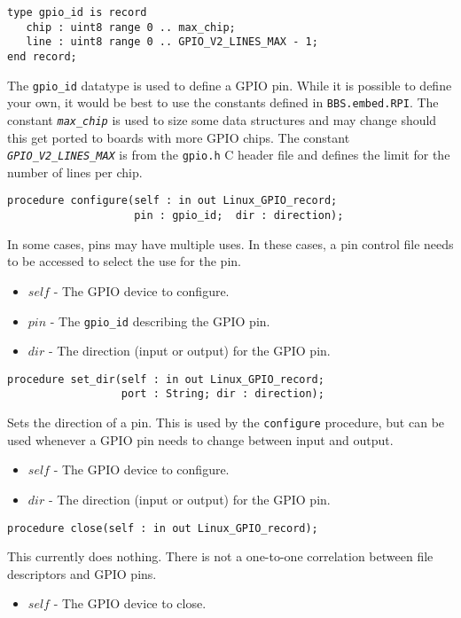 \documentclass[10pt, openany]{book}
\newcommand{\indextype}[1]{\index[type]{#1}}
\newcommand{\indexfunc}[1]{\index[func]{#1}}
\newcommand{\package}[1]{\texttt{#1}}
\newcommand{\function}[1]{\texttt{#1}}
\newcommand{\constant}[1]{\emph{\texttt{#1}}}
\newcommand{\datatype}[1]{\texttt{#1}}
\newcommand{\filename}[1]{\texttt{#1}}
\begin{document}
\begin{lstlisting}
type gpio_id is record
   chip : uint8 range 0 .. max_chip;
   line : uint8 range 0 .. GPIO_V2_LINES_MAX - 1;
end record;
\end{lstlisting}
\indextype{gpio\_id}
The \datatype{gpio\_id} datatype is used to define a GPIO pin.  While it is possible to define your own, it would be best to use the constants defined in \package{BBS.embed.RPI}.  The constant \constant{max\_chip} is used to size some data structures and may change should this get ported to boards with more GPIO chips.  The constant \constant{GPIO\_V2\_LINES\_MAX} is from the \filename{gpio.h} C header file and defines the limit for the number of lines per chip.

\begin{lstlisting}
procedure configure(self : in out Linux_GPIO_record;
                    pin : gpio_id;  dir : direction);
\end{lstlisting}
\indexfunc{configure}
In some cases, pins may have multiple uses.  In these cases, a pin control file needs to be accessed to select the use for the pin.
\begin{itemize}
  \item $self$ - The GPIO device to configure.
  \item $pin$ - The \datatype{gpio\_id} describing the GPIO pin.
  \item $dir$ - The direction (input or output) for the GPIO pin.
\end{itemize}

\begin{lstlisting}
procedure set_dir(self : in out Linux_GPIO_record;
                  port : String; dir : direction);
\end{lstlisting}
\indexfunc{set\_dir}
Sets the direction of a pin.  This is used by the \function{configure} procedure, but can be used whenever a GPIO pin needs to change between input and output.
\begin{itemize}
  \item $self$ - The GPIO device to configure.
  \item $dir$ - The direction (input or output) for the GPIO pin.
\end{itemize}

\begin{lstlisting}
procedure close(self : in out Linux_GPIO_record);
\end{lstlisting}
\indexfunc{close}
This currently does nothing.  There is not a one-to-one correlation between file descriptors and GPIO pins.
\begin{itemize}
  \item $self$ - The GPIO device to close.
\end{itemize}
\end{document}
